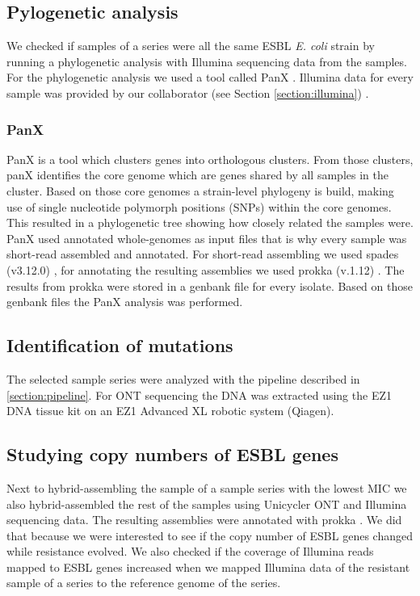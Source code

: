 \subsection{Pylogenetic analysis}
We checked if samples of a series were all the same ESBL \textit{E. coli} strain by running a phylogenetic analysis with Illumina sequencing data from the samples. For the phylogenetic analysis we used a tool called PanX \cite{ding_panx:_2018}. Illumina data for every sample was provided by our collaborator (see Section \ref{section:illumina}) .

\subsubsection{PanX}
PanX is a tool which clusters genes into orthologous clusters. From those clusters, panX identifies the core genome which are genes shared by all samples in the cluster. Based on those core genomes a strain-level phylogeny is build, making use of single nucleotide polymorph positions (SNPs) within the core genomes. This resulted in a phylogenetic tree showing how closely related the samples were. \\ 
PanX used annotated whole-genomes as input files that is why every sample was short-read assembled and annotated. For short-read assembling we used spades (v3.12.0) \cite{nurk_assembling_2013}, for annotating the resulting assemblies we used prokka (v.1.12) \cite{seemann_prokka:_2014}. The results from prokka were stored in a genbank file for every isolate. Based on those genbank files the PanX analysis was performed. \\

\subsection{Identification of mutations}
The selected sample series were analyzed with the pipeline described in \ref{section:pipeline}. For ONT sequencing the DNA was extracted using the EZ1 DNA tissue kit on an EZ1 Advanced XL robotic system (Qiagen).

\subsection{Studying copy numbers of ESBL genes}
Next to hybrid-assembling the sample of a sample series with the lowest MIC we also hybrid-assembled the rest of the samples using Unicycler \cite{wick_unicycler:_2017} ONT and Illumina sequencing data. The resulting assemblies were annotated with prokka \cite{seemann_prokka:_2014}. We did that because we were interested to see if the copy number of ESBL genes changed while resistance evolved. We also checked if the coverage of Illumina reads mapped to ESBL genes increased when we mapped Illumina data of the resistant sample of a series to the reference genome of the series.
